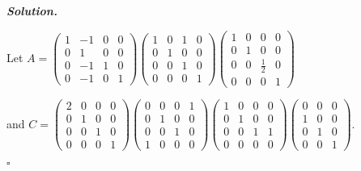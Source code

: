 \documentclass[12pt]{report}
\newenvironment{solution}[1][\it{Solution}]{\textbf{#1. } }{$\square$}
\begin{document}
\begin{solution}
\begin{enumerate}
        Let $A = \begin{pmatrix}1&-1&0&0\\ 0&1&0&0\\ 0&-1&1&0\\ 0&-1&0&1\end{pmatrix}\begin{pmatrix}1&0&1&0\\ 0&1&0&0\\ 0&0&1&0\\ 0&0&0&1\end{pmatrix}\begin{pmatrix}1&0&0&0\\ 0&1&0&0\\ 0&0&\frac{1}{2}&0\\ 0&0&0&1\end{pmatrix}$ 
        
        and $C = \begin{pmatrix}2&0&0&0\\ 0&1&0&0\\ 0&0&1&0\\ 0&0&0&1\end{pmatrix}\begin{pmatrix}0&0&0&1\\ 0&1&0&0\\ 0&0&1&0\\ 1&0&0&0\end{pmatrix}\begin{pmatrix}1&0&0&0\\ 0&1&0&0\\ 0&0&1&1\\ 0&0&0&0\end{pmatrix}\begin{pmatrix}0&0&0\\ 1&0&0\\ 0&1&0\\ 0&0&1\end{pmatrix}$.
        

\end{enumerate}
\end{solution}
\end{document}
